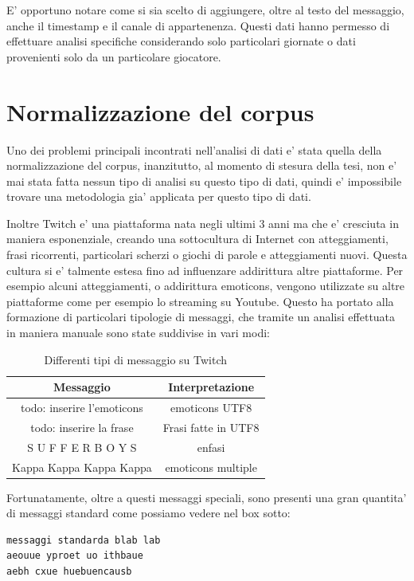 \documentclass[a4paper,12pt,openright,twoside]{report}
\theoremstyle{definition}
\begin{document}
E' opportuno notare come si sia scelto di aggiungere, oltre al testo del messaggio, anche il timestamp e il canale di appartenenza. Questi dati hanno permesso di effettuare analisi
specifiche considerando solo particolari giornate o dati provenienti solo da un particolare giocatore.

\section{Normalizzazione del corpus}
Uno dei problemi principali incontrati nell'analisi di dati e' stata quella della normalizzazione del corpus,
inanzitutto, al momento di stesura della tesi, non e' mai stata fatta nessun
tipo di analisi su questo tipo di dati, quindi
e' impossibile trovare una metodologia gia' applicata per questo tipo di dati.

Inoltre Twitch e' una piattaforma nata negli ultimi 3 anni ma che e' cresciuta in maniera esponenziale,
creando una sottocultura di Internet con atteggiamenti, frasi ricorrenti, particolari scherzi
o giochi di parole e atteggiamenti nuovi.
Questa cultura si e' talmente estesa fino ad influenzare addirittura altre piattaforme.
Per esempio alcuni atteggiamenti, o addirittura emoticons, vengono utilizzate su altre 
piattaforme come per esempio lo streaming su Youtube.
Questo ha portato alla formazione di particolari tipologie di messaggi, che tramite un analisi effettuata in maniera manuale sono state suddivise in vari modi:

\begin{table}
	\centering
	\begin{tabular}{|c|c|}
		\hline
		Messaggio & Interpretazione \\
		\hline
		\hline
		todo: inserire l'emoticons & emoticons UTF8 \\
		\hline
		todo: inserire la frase  & Frasi fatte in UTF8 \\
		\hline
		S U F F E R B O Y S & enfasi \\
		\hline
		Kappa Kappa Kappa Kappa & emoticons multiple \\
		\hline
	\end{tabular}
	\caption{Differenti tipi di messaggio su Twitch}
	\label{tab:messaggiTwitch}
\end{table}

Fortunatamente, oltre a questi messaggi speciali, sono presenti una gran quantita' di messaggi standard come possiamo vedere nel box sotto:
\begin{verbatim}
messaggi standarda blab lab
aeouue yproet uo ithbaue 
aebh cxue huebuencausb 
\end{verbatim}
\end{document}
